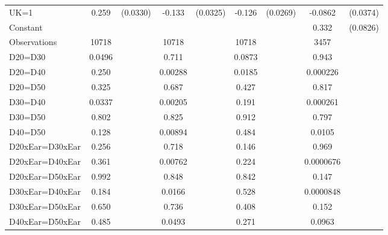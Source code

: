 \begin{tabular}{l|cccccc|cc}
UK=1            &    0.259\sym{***}& (0.0330)&   -0.133\sym{***}& (0.0325)&   -0.126\sym{***}& (0.0269)&  -0.0862\sym{**} & (0.0374)\\
Constant        &                  &         &                  &         &                  &         &    0.332\sym{***}& (0.0826)\\
\hline
Observations    &    10718         &         &    10718         &         &    10718         &         &     3457         &         \\
D20=D30         &   0.0496         &         &    0.711         &         &   0.0873         &         &    0.943         &         \\
D20=D40         &    0.250         &         &  0.00288         &         &   0.0185         &         & 0.000226         &         \\
D20=D50         &    0.325         &         &    0.687         &         &    0.427         &         &    0.817         &         \\
D30=D40         &   0.0337         &         &  0.00205         &         &    0.191         &         & 0.000261         &         \\
D30=D50         &    0.802         &         &    0.825         &         &    0.912         &         &    0.797         &         \\
D40=D50         &    0.128         &         &  0.00894         &         &    0.484         &         &   0.0105         &         \\
D20xEar=D30xEar &    0.256         &         &    0.718         &         &    0.146         &         &    0.969         &         \\
D20xEar=D40xEar &    0.361         &         &  0.00762         &         &    0.224         &         &0.0000676         &         \\
D20xEar=D50xEar &    0.992         &         &    0.848         &         &    0.842         &         &    0.147         &         \\
D30xEar=D40xEar &    0.184         &         &   0.0166         &         &    0.528         &         &0.0000848         &         \\
D30xEar=D50xEar &    0.650         &         &    0.736         &         &    0.408         &         &    0.152         &         \\
D40xEar=D50xEar &    0.485         &         &   0.0493         &         &    0.271         &         &   0.0963         &         \\

\end{tabular}
